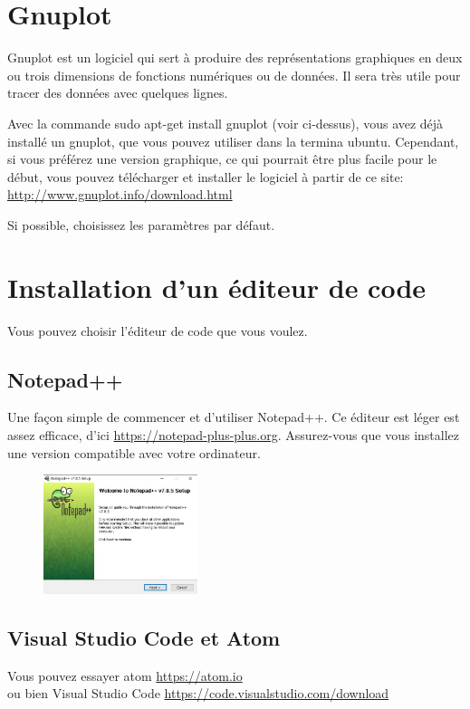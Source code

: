 \documentclass{article}
\begin{document}
\section{Gnuplot}
Gnuplot est un logiciel qui sert à produire des représentations graphiques en deux ou trois dimensions de fonctions numériques ou de données. Il sera très utile pour tracer des données avec quelques lignes. 

Avec la commande sudo apt-get install gnuplot (voir ci-dessus), vous avez déjà installé un gnuplot, que vous pouvez utiliser dans la termina ubuntu. Cependant, si vous préférez une version graphique, ce qui pourrait être plus facile pour le début, vous pouvez télécharger et installer le logiciel à partir de ce site: \href{http://www.gnuplot.info/download.html}{http://www.gnuplot.info/download.html} 

Si possible, choisissez les paramètres par défaut.

\section{Installation d'un éditeur de code}
Vous pouvez choisir l'éditeur de code que vous voulez. 
\subsection{Notepad++}
Une façon simple de commencer et d’utiliser Notepad++. Ce éditeur est léger est assez efficace, d'ici \href{https://notepad-plus-plus.org}{https://notepad-plus-plus.org}. Assurez-vous que vous installez une version compatible avec votre ordinateur.
\begin{figure}[H]
\center
\includegraphics[width=0.4\textwidth]{Plots/Editor_1.jpg}
\end{figure}
\subsection{Visual Studio Code et Atom\label{S:VisCodAtom}}
Vous pouvez essayer atom \href{https://atom.io}{https://atom.io}\\
ou bien Visual Studio Code \href{https://code.visualstudio.com/download}{https://code.visualstudio.com/download}
\end{document}
